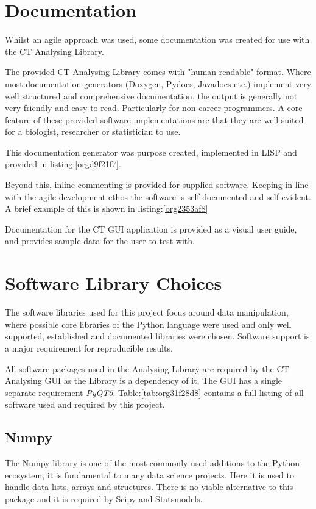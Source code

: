 \documentclass[11pt]{report}
\begin{document}
\section{Documentation}
\label{sec:orgc1dbcd7}
Whilst an agile approach was used, some documentation was created for use with the CT Analysing Library.

The provided CT Analysing Library comes with "human-readable" format. Where most documentation generators (Doxygen, Pydocs, Javadocs etc.) implement very well structured and comprehensive documentation, the output is generally not very friendly and easy to read. Particularly for non-career-programmers. A core feature of these provided software implementations are that they are well suited for a biologist, researcher or statistician to use.

This documentation generator was purpose created, implemented in LISP and provided in listing:\ref{orgd9f21f7}.

Beyond this, inline commenting is provided for supplied software. Keeping in line with the agile development ethos the software is self-documented and self-evident. A brief example of this is shown in listing:\ref{org2353af8}

Documentation for the CT GUI application is provided as a visual user guide, and provides sample data for the user to test with.
\section{Software Library Choices}
\label{sec:org2a7c4e9}
The software libraries used for this project focus around data manipulation, where possible core libraries of the Python language were used and only well supported, established and documented libraries were chosen. Software support is a major requirement for reproducible results.

All software packages used in the Analysing Library are required by the CT Analysing GUI as the Library is a dependency of it. The GUI has a single separate requirement \emph{PyQT5}.
Table:\ref{tab:org31f28d8} contains a full listing of all software used and required by this project.
\subsection{Numpy}
\label{sec:org5fe5832}
The Numpy library is one of the most commonly used additions to the Python ecosystem, it is fundamental to many data science projects. Here it is used to handle data lists, arrays and structures. There is no viable alternative to this package and it is required by Scipy and Statsmodels.
\end{document}
